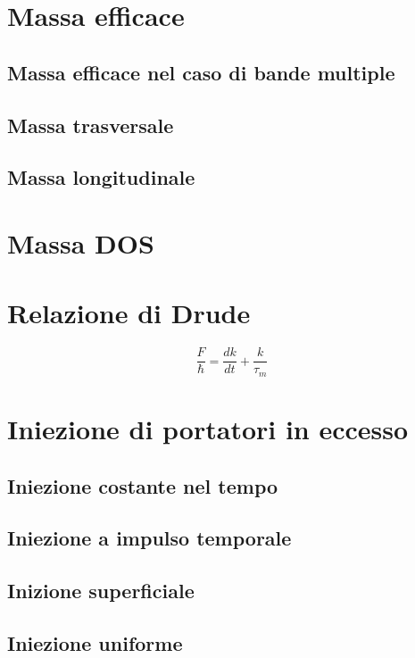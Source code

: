 \documentclass[10pt,a4paper]{report}
\begin{document}
\chapter{Massa efficace}

	\section{Massa efficace nel caso di bande multiple}

	\section{Massa trasversale}

	\section{Massa longitudinale}

\chapter{Massa DOS}

\chapter{Relazione di Drude}

\[
\frac{\textit{F}}{\hslash}=\frac{dk}{dt}+\frac{k}{\tau_m}
\]

\chapter{Iniezione di portatori in eccesso}

	\section{Iniezione costante nel tempo}

	\section{Iniezione a impulso temporale}

	\section{Inizione superficiale}

	\section{Iniezione uniforme}
\end{document}
